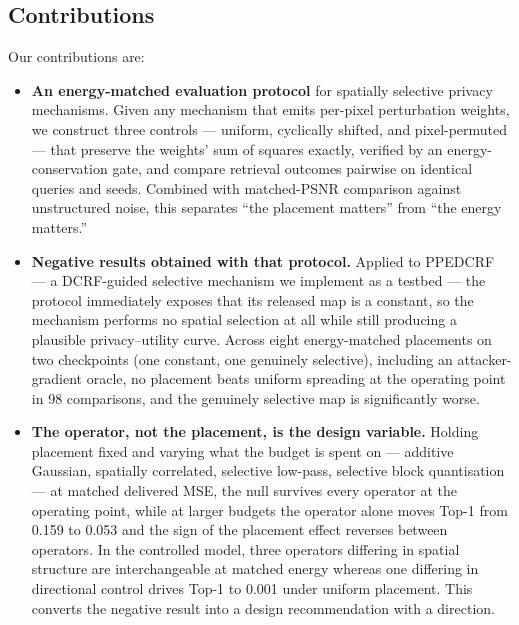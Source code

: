 \documentclass[10pt,journal]{IEEEtran}
\begin{document}
\subsection{Contributions}
Our contributions are:
\begin{itemize}
    \item \textbf{An energy-matched evaluation protocol} for spatially selective privacy mechanisms. Given any mechanism that emits per-pixel perturbation weights, we construct three controls --- uniform, cyclically shifted, and pixel-permuted --- that preserve the weights' sum of squares exactly, verified by an energy-conservation gate, and compare retrieval outcomes pairwise on identical queries and seeds. Combined with matched-PSNR comparison against unstructured noise, this separates ``the placement matters'' from ``the energy matters.''
    \item \textbf{Negative results obtained with that protocol.} Applied to PPEDCRF --- a DCRF-guided selective mechanism we implement as a testbed --- the protocol immediately exposes that its released map is a constant, so the mechanism performs no spatial selection at all while still producing a plausible privacy--utility curve. Across eight energy-matched placements on two checkpoints (one constant, one genuinely selective), including an attacker-gradient oracle, no placement beats uniform spreading at the operating point in 98 comparisons, and the genuinely selective map is significantly worse.
	\item \textbf{The operator, not the placement, is the design variable.} Holding placement fixed and varying what the budget is spent on --- additive Gaussian, spatially correlated, selective low-pass, selective block quantisation --- at matched delivered MSE, the null survives every operator at the operating point, while at larger budgets the operator alone moves Top-1 from 0.159 to 0.053 and the sign of the placement effect reverses between operators. In the controlled model, three operators differing in spatial structure are interchangeable at matched energy whereas one differing in directional control drives Top-1 to 0.001 under uniform placement. This converts the negative result into a design recommendation with a direction.

\end{itemize}
\end{document}
